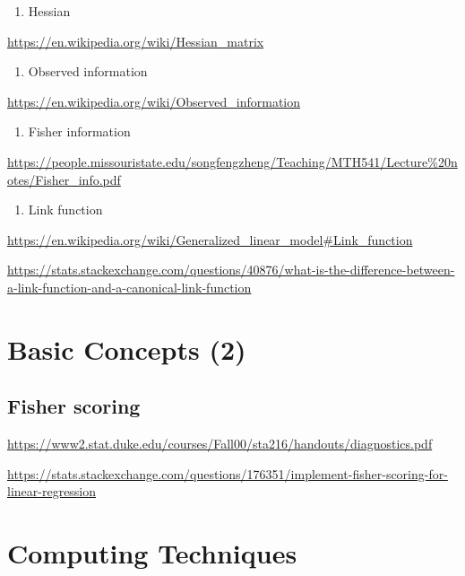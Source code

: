 \documentclass[]{book}
\providecommand{\tightlist}{%
  \setlength{\itemsep}{0pt}\setlength{\parskip}{0pt}}
\begin{document}
\begin{enumerate}
\def\labelenumi{\arabic{enumi}.}
\setcounter{enumi}{4}
\tightlist
\item
  Hessian
\end{enumerate}

\url{https://en.wikipedia.org/wiki/Hessian_matrix}

\begin{enumerate}
\def\labelenumi{\arabic{enumi}.}
\setcounter{enumi}{5}
\tightlist
\item
  Observed information
\end{enumerate}

\url{https://en.wikipedia.org/wiki/Observed_information}

\begin{enumerate}
\def\labelenumi{\arabic{enumi}.}
\setcounter{enumi}{6}
\tightlist
\item
  Fisher information
\end{enumerate}

\url{https://people.missouristate.edu/songfengzheng/Teaching/MTH541/Lecture\%20notes/Fisher_info.pdf}

\begin{enumerate}
\def\labelenumi{\arabic{enumi}.}
\setcounter{enumi}{7}
\tightlist
\item
  Link function
\end{enumerate}

\url{https://en.wikipedia.org/wiki/Generalized_linear_model\#Link_function}

\url{https://stats.stackexchange.com/questions/40876/what-is-the-difference-between-a-link-function-and-a-canonical-link-function}

\chapter{Basic Concepts (2)}\label{basic-concepts-2}

\section{Fisher scoring}\label{fisher-scoring}

\url{https://www2.stat.duke.edu/courses/Fall00/sta216/handouts/diagnostics.pdf}

\url{https://stats.stackexchange.com/questions/176351/implement-fisher-scoring-for-linear-regression}

\chapter{Computing Techniques}\label{computing-techniques}
\end{document}
